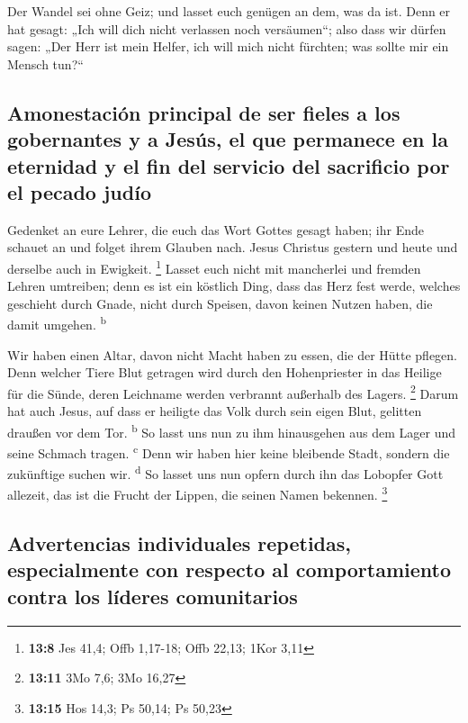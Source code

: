  Der Wandel sei ohne Geiz; und lasset euch genügen an dem,
was da ist. Denn er hat gesagt: „Ich will dich nicht verlassen noch
versäumen``;  also dass wir dürfen sagen: „Der Herr ist
mein Helfer, ich will mich nicht fürchten; was sollte mir ein Mensch
tun?{}``

\hypertarget{amonestaciuxf3n-principal-de-ser-fieles-a-los-gobernantes-y-a-jesuxfas-el-que-permanece-en-la-eternidad-y-el-fin-del-servicio-del-sacrificio-por-el-pecado-juduxedo}{%
\subsection{Amonestación principal de ser fieles a los gobernantes y a
Jesús, el que permanece en la eternidad y el fin del servicio del
sacrificio por el pecado
judío}\label{amonestaciuxf3n-principal-de-ser-fieles-a-los-gobernantes-y-a-jesuxfas-el-que-permanece-en-la-eternidad-y-el-fin-del-servicio-del-sacrificio-por-el-pecado-juduxedo}}

 Gedenket an eure Lehrer, die euch das Wort Gottes gesagt
haben; ihr Ende schauet an und folget ihrem Glauben nach. 
Jesus Christus gestern und heute und derselbe auch in Ewigkeit.
\footnote{\textbf{13:8} Jes 41,4; Offb 1,17-18; Offb 22,13; 1Kor 3,11}
 Lasset euch nicht mit mancherlei und fremden Lehren
umtreiben; denn es ist ein köstlich Ding, dass das Herz fest werde,
welches geschieht durch Gnade, nicht durch Speisen, davon keinen Nutzen
haben, die damit umgehen. \textsuperscript{b}

 Wir haben einen Altar, davon nicht Macht haben zu essen,
die der Hütte pflegen.  Denn welcher Tiere Blut getragen
wird durch den Hohenpriester in das Heilige für die Sünde, deren
Leichname werden verbrannt außerhalb des Lagers. \footnote{\textbf{13:11}
  3Mo 7,6; 3Mo 16,27}  Darum hat auch Jesus, auf dass er
heiligte das Volk durch sein eigen Blut, gelitten draußen vor dem Tor.
\textsuperscript{b}  So lasst uns nun zu ihm hinausgehen
aus dem Lager und seine Schmach tragen. \textsuperscript{c}
 Denn wir haben hier keine bleibende Stadt, sondern die
zukünftige suchen wir. \textsuperscript{d}  So lasset uns
nun opfern durch ihn das Lobopfer Gott allezeit, das ist die Frucht der
Lippen, die seinen Namen bekennen. \footnote{\textbf{13:15} Hos 14,3; Ps
  50,14; Ps 50,23}

\hypertarget{advertencias-individuales-repetidas-especialmente-con-respecto-al-comportamiento-contra-los-luxedderes-comunitarios}{%
\subsection{Advertencias individuales repetidas, especialmente con
respecto al comportamiento contra los líderes
comunitarios}\label{advertencias-individuales-repetidas-especialmente-con-respecto-al-comportamiento-contra-los-luxedderes-comunitarios}}

